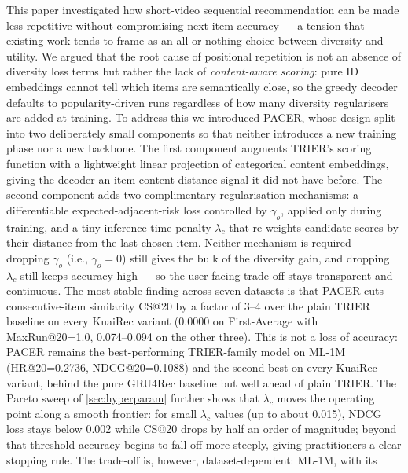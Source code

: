 \begin{conclusion}
This paper investigated how short-video sequential recommendation can be
made less repetitive without compromising next-item accuracy --- a tension
that existing work tends to frame as an all-or-nothing choice between
diversity and utility. We argued that the root cause of positional
repetition is not an absence of diversity loss terms but rather the lack
of \emph{content-aware scoring}: pure ID embeddings cannot tell which
items are semantically close, so the greedy decoder defaults to
popularity-driven runs regardless of how many diversity regularisers are
added at training. To address this we introduced PACER, whose design split
into two deliberately small components so that neither introduces a new
training phase nor a new backbone. The first component augments TRIER's
scoring function with a lightweight linear projection of categorical
content embeddings, giving the decoder an item-content distance signal it
did not have before. The second component adds two complimentary
regularisation mechanisms: a differentiable expected-adjacent-risk loss
controlled by $\gamma_o$, applied only during training, and a tiny
inference-time penalty $\lambda_c$ that re-weights candidate scores by
their distance from the last chosen item. Neither mechanism is required
--- dropping $\gamma_o$ (i.e., $\gamma_o=0$) still gives the bulk of the
diversity gain, and dropping $\lambda_c$ still keeps accuracy high --- so
the user-facing trade-off stays transparent and continuous.
The most stable finding across seven datasets is that PACER cuts
consecutive-item similarity CS@20 by a factor of 3--4 over the plain
TRIER baseline on every KuaiRec variant (0.0000 on First-Average with
MaxRun@20=1.0, 0.074--0.094 on the other three). This is not a loss of
accuracy: PACER remains the best-performing TRIER-family model on ML-1M
(HR@20=0.2736, NDCG@20=0.1088) and the second-best on every KuaiRec
variant, behind the pure GRU4Rec baseline but well ahead of plain TRIER.
The Pareto sweep of \cref{sec:hyperparam} further shows that $\lambda_c$
moves the operating point along a smooth frontier: for small $\lambda_c$
values (up to about 0.015), NDCG loss stays below 0.002 while CS@20
drops by half an order of magnitude; beyond that threshold accuracy
begins to fall off more steeply, giving practitioners a clear stopping
rule. The trade-off is, however, dataset-dependent: ML-1M, with its

\end{conclusion}
